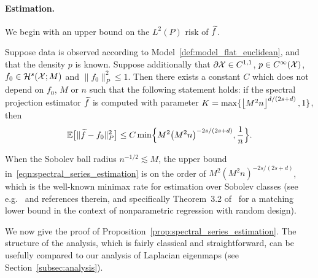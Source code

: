 \paragraph{Estimation.}
We begin with an upper bound on the $L^2(P)$ risk of $\widetilde{f}$.
\begin{proposition}
	\label{prop:spectral_series_estimation}
	Suppose data is observed according to Model~\ref{def:model_flat_euclidean}, and that the density $p$ is known.  Suppose additionally that $\partial \mathcal{X} \in C^{1,1}$, $p \in C^{\infty}(\mathcal{X})$, $f_0 \in \mathcal{H}^{s}(\mathcal{X};M)$ and $\|f_0\|_P^2 \leq 1$. Then there exists a constant $C$ which does not depend on $f_0$, $M$ or $n$ such that the following statement holds: if the spectral projection estimator $\widetilde{f}$ is computed with parameter $K = \max\{\left\lfloor M^2n \right\rfloor^{d/(2s + d)},1\}$, then
	\begin{equation}
	\label{eqn:spectral_series_estimation}
	\mathbb{E}\bigl[\|\widetilde{f} - f_0\|_P^2\bigr] \leq C \min\Bigl\{M^2\bigl(M^2n\bigr)^{-2s/(2s + d)}, \frac{1}{n}\Bigr\}.
	\end{equation}
\end{proposition}
When the Sobolev ball radius $n^{-1/2} \lesssim M$, the upper bound in~\eqref{eqn:spectral_series_estimation} is on the order of $M^2(M^2n)^{-2s/(2s + d)}$, which is the well-known minimax rate for estimation over Sobolev classes (see e.g.~\cite{gyorfi2006,wasserman2006,tsybakov08} and references therein, and specifically Theorem~3.2 of~\cite{gyorfi2006} for a matching lower bound in the context of nonparametric regression with random design). 


We now give the proof of Proposition~\ref{prop:spectral_series_estimation}. The structure of the analysis, which is fairly classical and straightforward, can be usefully compared to our analysis of Laplacian eigenmaps (see Section~\ref{subsec:analysis}).

